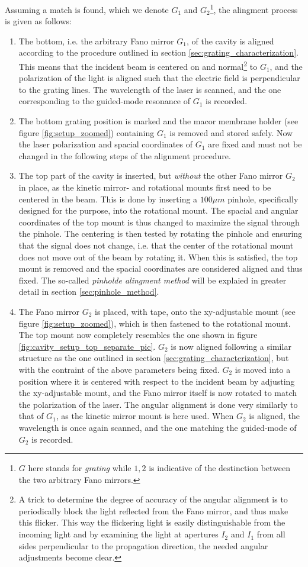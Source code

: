 Assuming a match is found, which we denote $G_1$ and $G_2$\footnote{$G$ here stands for \emph{grating} while $1,2$ is indicative of the destinction between the two arbitrary Fano mirrors.}, the alingment process is given as follows: 
\begin{enumerate}
    \item The bottom, i.e. the arbitrary Fano mirror $G_1$, of the cavity is aligned according to the procedure outlined in section \ref{sec:grating_characterization}. This means that the incident beam is centered on and normal\footnote{A trick to determine the degree of accuracy of the angular alignment is to periodically block the light reflected from the Fano mirror, and thus make this flicker. This way the flickering light is easily distinguishable from the incoming light and by examining the light at apertures $I_2$ and $I_1$ from all sides perpendicular to the propagation direction, the needed angular adjustments become clear.} to $G_1$, and the polarization of the light is aligned such that the electric field is perpendicular to the grating lines. The wavelength of the laser is scanned, and the one corresponding to the guided-mode resonance of $G_1$ is recorded.  
    \item The bottom grating position is marked and the macor membrane holder (see figure \ref{fig:setup_zoomed}) containing $G_1$ is removed and stored safely. Now the laser polarization and spacial coordinates of $G_1$ are fixed and must not be changed in the following steps of the alignment procedure.
    \item The top part of the cavity is inserted, but \emph{without} the other Fano mirror $G_2$ in place, as the kinetic mirror- and rotational mounts first need to be centered in the beam. This is done by inserting a $100 \mu m$ pinhole, specifically designed for the purpose, into the rotational mount. The spacial and angular coordinates of the top mount is thus changed to maximize the signal through the pinhole. The centering is then tested by rotating the pinhole and ensuring that the signal does not change, i.e. that the center of the rotational mount does not move out of the beam by rotating it. When this is satisfied, the top mount is removed and the spacial coordinates are considered aligned and thus fixed. The so-called \emph{pinholde alingment method} will be explaied in greater detail in section \ref{sec:pinhole_method}.
    \item The Fano mirror $G_2$ is placed, with tape, onto the xy-adjustable mount (see figure \ref{fig:setup_zoomed}), which is then fastened to the rotational mount. The top mount now completely resembles the one shown in figure \ref{fig:cavity_setup_top_separate_pic}. $G_2$ is now aligned following a similar structure as the one outlined in section \ref{sec:grating_characterization}, but with the contraint of the above parameters being fixed. $G_2$ is moved into a position where it is centered with respect to the incident beam by adjusting the xy-adjustable mount, and the Fano mirror itself is now rotated to match the polarization of the laser. The angular alignment is done very similarly to that of $G_1$, as the kinetic mirror mount is here used. When $G_2$ is aligned, the wavelength is once again scanned, and the one matching the guided-mode of $G_2$ is recorded.

\end{enumerate}
